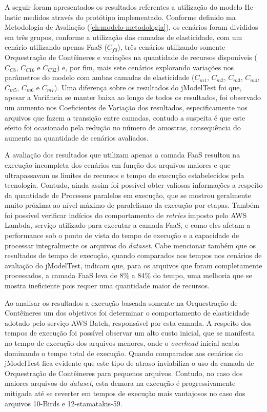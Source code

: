 \documentclass[english,brazilian]{UNISINOSmonografia} %
\begin{document}
A seguir foram apresentados os resultados referentes a utilização do modelo \textsf{He}--lastic medidos através do protótipo implementado.
%
Conforme definido ma Metodologia de Avaliação (\autoref{ch:modelo-metodologia}), os cenários foram divididos em três grupos, conforme a utilização das camadas de elasticidade, com um cenário utilizando apenas FaaS ($C_{f0}$), três cenários utilizando somente Orquestração de Contêineres e variações na quantidade de recursos disponíveis ($C_{C8}$, $C_{C16}$ e $C_{C32}$) e, por fim, mais sete cenários explorando variações nos parâmetros do modelo com ambas camadas de elasticidade ($C_{m1}$, $C_{m2}$, $C_{m3}$, $C_{m4}$, $C_{m5}$, $C_{m6}$ e $C_{m7}$).
%
Uma diferença sobre os resultados do jModelTest foi que, apesar a Variância se manter baixa ao longo de todos os resultados, foi observado um aumento nos Coeficientes de Variação dos resultados, especificamente nos arquivos que fazem a transição entre camadas, contudo a suspeita é que este efeito foi ocasionado pela redução no número de amostras, consequência do aumento na quantidade de cenários avaliados.



A avaliação dos resultados que utilizam apenas a camada FaaS resultou na execução incompleta dos cenários em função dos arquivos maiores e que ultrapassavam os limites de recursos e tempo de execução estabelecidos pela tecnologia.
%
Contudo, ainda assim foi possível obter valiosas informações a respeito da quantidade de Processos paralelos em execução, que se mostrou geralmente muito próxima ao nível máximo de paralelismo da execução por etapas.
%
Também foi possível verificar indícios do comportamento de \textit{retries} imposto pelo AWS Lambda, serviço utilizado para executar a camada FaaS, e como eles afetam a performance sob o ponto de vista do tempo de execução e a capacidade de processar integralmente os arquivos do \textit{dataset}.
%
Cabe mencionar também que os resultados de tempo de execução, quando comparados aos tempos nos cenários de avaliação do jModelTest, indicam que, para os arquivos que foram completamente processados, a camada FaaS leva de 8\% a 84\% do tempo, uma melhoria que se mostra ineficiente pois requer uma quantidade maior de recursos.



Ao analisar os resultados a execução baseada somente na Orquestração de Contêineres um dos objetivos foi determinar o comportamento de elasticidade adotado pelo serviço AWS Batch, responsável por esta camada.
%
A respeito dos tempos de execução foi possível observar um alto custo inicial, que se manifesta no tempo de execução dos arquivos menores, onde o \textit{overhead} inicial acaba dominando o tempo total de execução.
%
Quando comparados aos cenários do jModelTest fica evidente que este tipo de atraso inviabiliza o uso da camada de Orquestração de Contêineres para pequenos arquivos.
%
Contudo, no caso dos maiores arquivos do \textit{dataset}, esta demora na execução é progressivamente mitigada até se reverter em tempos de execução mais vantajosos no caso dos arquivos 10-Birds e 12-stamatakis-59.
\end{document}
